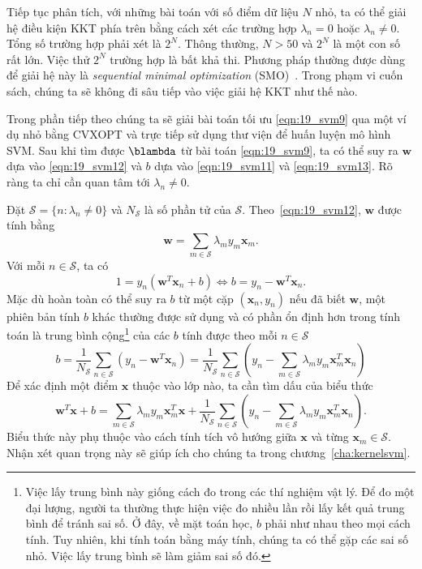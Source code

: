 Tiếp tục phân tích, với những bài toán với số điểm dữ liệu $N$ nhỏ, ta có thể
giải hệ điều kiện KKT phía trên bằng cách xét các trường hợp $\lambda_n = 0$
hoặc $\lambda_n \neq 0$. Tổng số trường hợp phải xét là $2^N$. Thông thường, $N
> 50$ và $2^N$ là một con số rất lớn. Việc thử $2^N$ trường hợp là bất khả thi.
Phương pháp thường được dùng để giải hệ này là \textit{sequential minimal
optimization} (SMO)~\cite{platt1998sequential,zeng2008fast}. Trong phạm vi cuốn
sách, chúng ta sẽ không đi sâu tiếp vào việc giải hệ KKT như thế nào.

Trong phần tiếp
theo chúng ta sẽ giải bài toán tối ưu \eqref{eqn:19_svm9} qua một ví dụ nhỏ bằng CVXOPT và trực tiếp sử dụng thư viện  để huấn luyện mô hình SVM.
 Sau khi tìm được $\blambda$ từ bài toán \eqref{eqn:19_svm9}, ta có thể suy ra $\mathbf{w}$ dựa vào \eqref{eqn:19_svm12} và $b$ dựa vào
\eqref{eqn:19_svm11} và \eqref{eqn:19_svm13}. Rõ ràng ta chỉ cần quan tâm tới
$\lambda_n \neq 0$.
 
Đặt $\mathcal{S} = \{n: \lambda_n \neq 0\}$ và $N_{\mathcal{S}}$ là số
phần tử của $\mathcal{S}$. Theo~\eqref{eqn:19_svm12}, $\mathbf{w}$ được tính bằng
\begin{equation} 
\label{eqn:19_}
\mathbf{w} = \sum_{m \in \mathcal{S}} \lambda_m y_m \mathbf{x}_m. 
\end{equation} 
Với mỗi $n \in \mathcal{S}$, ta có
\begin{equation*}  
1 = y_n(\mathbf{w}^T\mathbf{x}_n + b) \Leftrightarrow b = y_n  - \mathbf{w}^T\mathbf{x}_n.
\end{equation*}  
Mặc dù hoàn toàn có thể suy ra $b$ từ một cặp $(\mathbf{x}_n, y_n)$
nếu đã biết $\mathbf{w}$, một phiên bản tính $b$ khác thường được sử dụng và có phần {ổn định hơn trong tính toán} 
là trung bình cộng\footnote{Việc lấy trung bình này giống cách đo trong các thí
nghiệm vật lý. Để đo một đại lượng, người ta thường thực hiện việc đo nhiều lần
rồi lấy kết quả trung bình để tránh sai số. Ở đây, về mặt toán học, $b$ phải như
nhau theo mọi cách tính. Tuy nhiên, khi tính toán bằng máy tính, chúng ta có thể
gặp các sai số nhỏ. Việc lấy trung bình sẽ làm giảm sai số đó.}  của các
$b$ tính được theo mỗi $n \in
\mathcal{S}$
\begin{equation}
\label{eqn:19_svm15}
    b = \frac{1}{N_{\mathcal{S}}} \sum_{n \in \mathcal{S}}(y_n - \mathbf{w}^T\mathbf{x}_n) = 
    \frac{1}{N_{\mathcal{S}}} \sum_{n \in \mathcal{S}} \left(y_n - \sum_{m\in
    \mathcal{S}} \lambda_m y_m \mathbf{x}_m^T \mathbf{x}_n\right)
\end{equation} 
Để xác định một điểm $\mathbf{x}$ thuộc vào lớp nào, ta cần tìm dấu
của biểu thức
\begin{equation*} 
\mathbf{w}^T\mathbf{x} + b = \sum_{m \in \mathcal{S}} \lambda_m y_m
\mathbf{x}_m^T \mathbf{x} + \frac{1}{N_{\mathcal{S}}} \sum_{n \in \mathcal{S}}
\left(y_n - \sum_{m\in \mathcal{S}} \lambda_m y_m \mathbf{x}_m^T \mathbf{x}_n\right). 
\end{equation*} 
Biểu thức này phụ thuộc vào cách tính tích vô hướng giữa $\mathbf{x}$ và từng
$\mathbf{x}_m \in \mathcal{S}$. Nhận xét quan trọng này sẽ giúp ích cho chúng ta
trong chương~\ref{cha:kernelsvm}.
 
